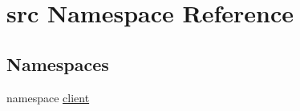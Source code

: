 \hypertarget{namespacesrc}{
\section{src Namespace Reference}
\label{namespacesrc}
}
\subsection*{Namespaces}
\begin{DoxyCompactItemize}
\item 
namespace \hyperlink{namespacesrc_1_1client}{client}
\end{DoxyCompactItemize}
